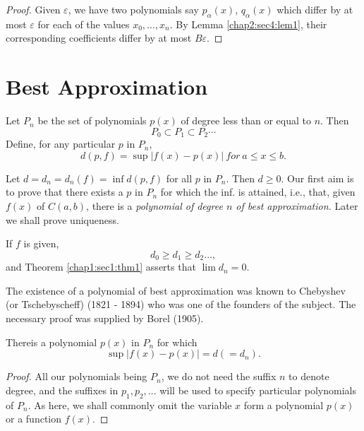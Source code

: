 \begin{proof}
  Given $ \varepsilon $, we have two polynomials say $ p_\alpha (x) $,
  $ q_\alpha (x) $ which differ by at most $ \varepsilon $  for each
  of the   values $ x_0,  \ldots,  x_n $. By Lemma \ref{chap2:sec4:lem1},  their
  corresponding coefficients differ by at most $ B \varepsilon $. 
\end{proof}

\section{Best Approximation}\label{chap2:sec5}%

 Let $ P_n $ be the set of polynomials $ p (x) $ of degree less than
 or equal to $n$. Then 
 $$
 P_0 \subset P_1 \subset P_2  \cdots 
 $$
 Define, for any particular $p$ in $P_n$,
 $$
 d (p, f) = \sup | f (x) - p (x)  |~  for ~ a \leq x \leq b.
 $$
 
Let $d = d_n = d_n (f) = \inf d (p,f) $ for all $p$ in $P_n $. Then $
d \ge 0 $. Our first aim is to prove that there exists  a $p$ in $P_n
$ for which the inf. is attained, i.e., that, given $ f (x) $ of $ C
(a,b) $, there is a \textit{polynomial of degree $n$  of best
  approximation.} Later we shall prove uniqueness. 

If $f$ is given,
$$
d_0 \ge d_1 \ge d_2 \ldots, 
$$
and Theorem \ref{chap1:sec1:thm1} asserts that $ \lim d_n = 0 $.

The existence of a polynomial of best approximation was known to
Chebyshev (or Tschebyscheff) (1821 - 1894) who was one of the
founders of the subject. The necessary proof was supplied by Borel (1905). 

\begin{theorem}\label{chap2:sec5:thm4} %
  There\pageoriginale is a polynomial $ p (x) $ in $P_n $ for which
  $$
  \sup | f (x) - p(x) | = d (= d_n).
  $$
\end{theorem}

\begin{proof}
  All our polynomials being $ P_n $, we do not need the suffix $n$ to
  denote degree, and the suffixes in $ p_1, p_2, \ldots $ will be used
  to specify particular polynomials of $ P_n $. As here, we shall
  commonly omit the variable $x$ form a polynomial $ p (x) $ or a
  function  $ f (x) $.  
\end{proof}

